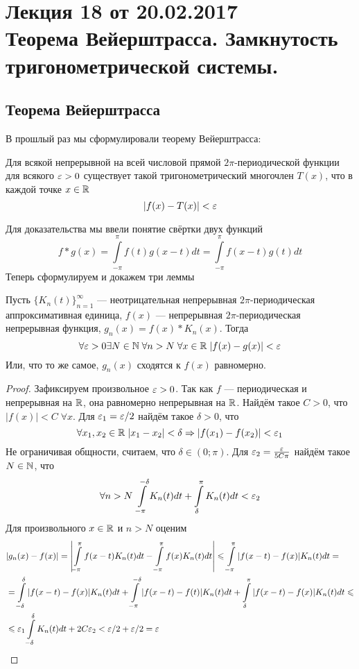 \newcommand{\lmao}{неотрицательная непрерывная $2\pi$-периодическая аппроксимативная единица}
\pagestyle{fancy}
\section{Лекция 18 от 20.02.2017 \\  Теорема Вейерштрасса. Замкнутость тригонометрической системы.}
\subsection{Теорема Вейерштрасса}
В прошлый раз мы сформулировали теорему Вейерштрасса:
\begin{Theorem}
	Для всякой непрерывной на всей числовой прямой $2\pi$-периодической функции для всякого $\varepsilon>0$ существует такой тригонометрический многочлен $T(x)$, что в каждой точке $x \in \mathbb{R}$ $$
	 |f(x)-T(x)| < \varepsilon
	$$
\end{Theorem}
	Для доказательства мы ввели понятие свёртки двух функций
	$$
		f*g(x) = \int\limits_{-\pi}^{\pi} f(t)g(x-t)dt = \int\limits_{-\pi}^{\pi}f(x-t)g(t)dt
	$$
	Теперь сформулируем и докажем три леммы
\begin{Lemma}
	Пусть $\{K_n(t)\}_{n=1}^{\infty}$ --- \lmao, $f(x)$ --- непрерывная $2\pi$-периодическая непрерывная функция, $g_n(x) = f(x)*K_n(x)$. Тогда 
	$$
		\forall \varepsilon>0 \exists N\in \mathbb{N}\; \forall n>N\; \forall x\in\mathbb{R}\; |f(x) - g(x)| < \varepsilon
	$$
	Или, что то же самое, $g_n(x)$ сходятся к $f(x)$ равномерно.
	\begin{proof}
		Зафиксируем произвольное $\varepsilon > 0$. Так как $f$ --- периодическая и непрерывная на $\mathbb{R}$, она равномерно непрерывная на $\mathbb{R}$. Найдём такое $C>0$, что $|f(x)| <C\; \forall x$. Для $\varepsilon_1 = \varepsilon/2$ найдём такое $\delta > 0$, что
		$$
			\forall x_1, x_2\in  \mathbb{R}\; |x_1-x_2| < \delta \Rightarrow |f(x_1) - f(x_2)| < \varepsilon_1 
		$$
		Не ограничивая общности, считаем, что $\delta \in (0; \pi)$.
		Для $\varepsilon_2 = \frac{\varepsilon}{5C\pi}$ найдём такое $N\in \mathbb{N}$, что
		$$
			\forall n>N\; \int\limits_{-\pi}^{-\delta}  K_n(t)dt+ \int\limits_{\delta}^{\pi} K_n(t)dt < \varepsilon_2
		$$
		Для произвольного $x\in \mathbb{R}$ и $n >N$ оценим
		\begin{align*}
			&|g_n(x) - f(x)|= \left| \int \limits_{-\pi}^{\pi}f(x-t)K_n(t)dt - \int \limits_{-\pi}^{\pi}f(x)K_n(t)dt\right| \leqslant \int \limits_{-\pi}^{\pi}|f(x-t) -f(x)|K_n(t) dt =\\&= \int \limits_{-\delta}^{\delta}|f(x-t) - f(x)|K_n(t)dt + \int \limits_{-\pi}^{-\delta}|f(x-t) - f(t)|K_n(t)dt + \int \limits_{\delta}^{\pi}|f(x-t) - f(x)|K_n(t)dt \leqslant \\ &\leqslant
			\varepsilon_1 \int \limits_{-\delta}^{\delta}K_n(t)dt + 2C\varepsilon_2 < \varepsilon/2 + \varepsilon/2 = \varepsilon
		\end{align*}
	\end{proof}
\end{Lemma}
